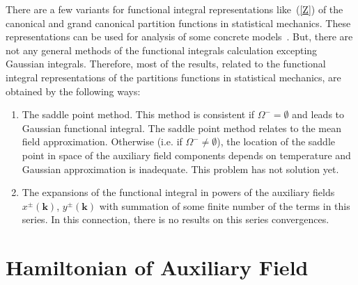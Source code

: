 \documentclass[aps,pre,preprint,floatfix,twoside,tightenlines,showpacs,
showkeys]{revtex4}
\begin{document}
There are a few variants for functional integral representations like~(\ref{Z}) of the canonical and grand canonical partition functions in statistical mechanics. These representations can be used for analysis of some concrete models~\cite{Zak2,Efi,Bae1,Bae2}. But, there are not any general methods of the functional integrals calculation excepting Gaussian integrals. Therefore, most of the results, related to the functional integral representations of the partitions functions in statistical mechanics, are obtained by the following ways:
\begin{enumerate}
    \item The saddle point method. This method is consistent if $\Omega^- = \emptyset$ and leads to Gaussian functional integral. The saddle point method relates to the mean field approximation. Otherwise (i.e. if $\Omega^- \not= \emptyset$), the location of the saddle point in space of the auxiliary field components depends on temperature and Gaussian approximation is inadequate. This problem has not solution yet. 
    \item The expansions of the functional integral in powers of the auxiliary fields $x^{\pm}(\mathbf{k})$, $y^{\pm}(\mathbf{k})$ with summation  of some finite number of the terms in this series. In this connection, there is no results on this series convergences.
\end{enumerate}





\section{Hamiltonian of Auxiliary Field}
\end{document}
